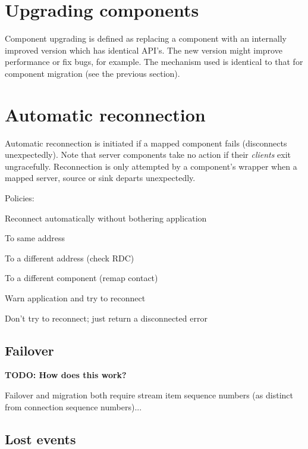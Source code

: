 \documentclass[12pt,a4paper,twoside]{article}
\renewcommand{\_}{\texttt{\symbol{95}}}
\newcommand{\todo}[1]{\textbf{TODO: #1}}
\begin{document}
\section{Upgrading components}

Component upgrading is defined as replacing a component with an internally
improved version which has identical API's. The new version might improve
performance or fix bugs, for example. The mechanism used is identical to that
for component migration (see the previous section).

\section{Automatic reconnection}

Automatic reconnection is initiated if a mapped component fails
(disconnects unexpectedly). Note that server components take no action if
their \textit{clients} exit ungracefully.
Reconnection is only attempted by a component's wrapper when a mapped
server, source or sink departs unexpectedly.

Policies:

\begin{bulletlist}
\item Reconnect automatically without bothering application
	\begin{bulletlist}
	\item To same address
	\item To a different address (check RDC)
	\item To a different component (remap contact)
	\end{bulletlist}
\item Warn application and try to reconnect
\item Don't try to reconnect; just return a disconnected error
\end{bulletlist}

\subsection{Failover}

\todo{How does this work?}

Failover and migration both require stream item sequence numbers
(as distinct from connection sequence numbers)...

\subsection{Lost events}
\end{document}
